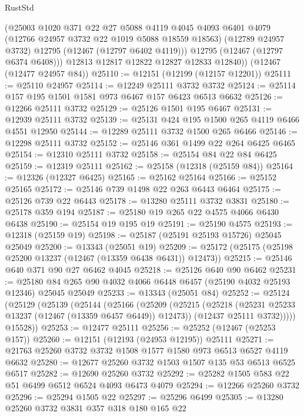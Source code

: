 \begin{lexlean}{RustStd}
\begin{coremodule}
          (@25003
            @1020
            @371
            @22
            @27
            @5088
            @4119
            @4045
            @4093
            @6401
            @4079
            (@12766 @24957 @3732 @22 @1019 @5088 @18559 @18563)
            (@12789 @24957 @3732)
            @12795
            (@12467 (@12797 @6402 @4119)))
          @12795
          (@12467 (@12797 @6374 @6408)))
        @12813
        @12817
        @12822
        @12827
        @12833
        @12840))
    (@12467 (@12477 @24957 @84))
@25110 := @12151 (@12199 (@12157 @12201))
@25111 := @25110 @24957
@25114 := @12249 @25111 @3732 @3732
@25124 := @25114 @157 @195 @1501 @1581 @973 @6467 @157 @6423 @6513 @6632
@25126 := @12266 @25111 @3732
@25129 := @25126 @1501 @195 @6467
@25131 := @12939 @25111 @3732
@25139 := @25131 @424 @195 @1500 @265 @4119 @6466 @4551 @12950
@25144 := @12289 @25111 @3732 @1500 @265 @6466
@25146 := @12298 @25111 @3732
@25152 := @25146 @361 @1499 @22 @264 @6425 @6465
@25154 := @12310 @25111 @3732
@25158 := @25154 @84 @22 @84 @6425
@25159 := @12319 @25111
@25162 := @25158 (@12318 (@25159 @84))
@25164 := @12326 (@12327 @6425)
@25165 := @25162 @25164
@25166 := @25152 @25165
@25172 := @25146 @739 @1498 @22 @263 @6443 @6464
@25175 := @25126 @739 @22 @6443
@25178 := @13280 @25111 @3732 @3831
@25180 := @25178 @359 @194
@25187 := @25180 @19 @265 @22 @4575 @4066 @6430 @6438
@25190 := @25154 @19 @195 @19
@25191 := @25190 @4575
@25193 := @12318 (@25159 @19)
@25198 := @25187 (@25191 @25193 @15726) @25045 @25049
@25200 := @13343 (@25051 @19)
@25209 := @25172 (@25175 (@25198 @25200 @13237 (@12467 (@13359 @6438 @6431)) @12473))
@25215 := @25146 @640 @371 @90 @27 @6462 @4045
@25218 := @25126 @640 @90 @6462
@25231 := @25180 @84 @265 @90 @4032 @4066 @6448 @6457 (@25190 @4032 @25193 @12346) @25045 @25049
@25233 := @13343 (@25051 @84)
@25252 := @25124
    (@25129
      (@25139
        (@25144
          (@25166
            (@25209
              (@25215
                (@25218 (@25231 @25233 @13237 (@12467 (@13359 @6457 @6449)) @12473))
                (@12437 @25111 @3732)))))
        @15528))
@25253 := @12477 @25111
@25256 := @25252 (@12467 (@25253 @157))
@25260 := @12151 (@12193 (@24953 @12195)) @25111
@25271 := @21763 @25260 @3732 @3732 @1508 @1577 @1580 @973 @6513 @6527 @4119 @6632
@25280 := @12677 @25260 @3732 @1503 @1507 @135 @53 @6513 @6525 @6517
@25282 := @12690 @25260 @3732
@25292 := @25282 @1505 @583 @22 @51 @6499 @6512 @6524 @4093 @6473 @4079
@25294 := @12266 @25260 @3732
@25296 := @25294 @1505 @22
@25297 := @25296 @6499
@25305 := @13280 @25260 @3732 @3831 @357 @318 @180 @165 @22

\end{coremodule}
\end{lexlean}
